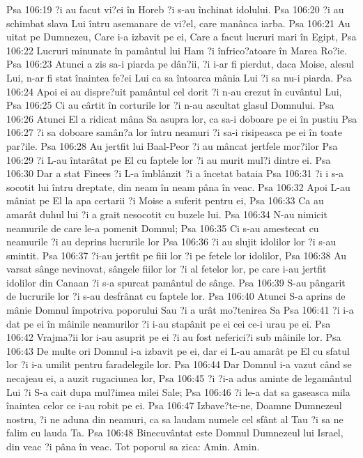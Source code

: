 Psa 106:19  ?i au facut vi?ei în Horeb ?i s-au închinat idolului.
Psa 106:20  ?i au schimbat slava Lui întru asemanare de vi?el, care manânca iarba.
Psa 106:21  Au uitat pe Dumnezeu, Care i-a izbavit pe ei, Care a facut lucruri mari în Egipt,
Psa 106:22  Lucruri minunate în pamântul lui Ham ?i înfrico?atoare în Marea Ro?ie.
Psa 106:23  Atunci a zis sa-i piarda pe dân?ii, ?i i-ar fi pierdut, daca Moise, alesul Lui, n-ar fi stat înaintea fe?ei Lui ca sa întoarca mânia Lui ?i sa nu-i piarda.
Psa 106:24  Apoi ei au dispre?uit pamântul cel dorit ?i n-au crezut în cuvântul Lui,
Psa 106:25  Ci au cârtit în corturile lor ?i n-au ascultat glasul Domnului.
Psa 106:26  Atunci El a ridicat mâna Sa asupra lor, ca sa-i doboare pe ei în pustiu
Psa 106:27  ?i sa doboare samân?a lor întru neamuri ?i sa-i risipeasca pe ei în toate par?ile.
Psa 106:28  Au jertfit lui Baal-Peor ?i au mâncat jertfele mor?ilor
Psa 106:29  ?i L-au întarâtat pe El cu faptele lor ?i au murit mul?i dintre ei.
Psa 106:30  Dar a stat Finees ?i L-a îmblânzit ?i a încetat bataia
Psa 106:31  ?i i s-a socotit lui întru dreptate, din neam în neam pâna în veac.
Psa 106:32  Apoi L-au mâniat pe El la apa certarii ?i Moise a suferit pentru ei,
Psa 106:33  Ca au amarât duhul lui ?i a grait nesocotit cu buzele lui.
Psa 106:34  N-au nimicit neamurile de care le-a pomenit Domnul;
Psa 106:35  Ci s-au amestecat cu neamurile ?i au deprins lucrurile lor
Psa 106:36  ?i au slujit idolilor lor ?i s-au smintit.
Psa 106:37  ?i-au jertfit pe fiii lor ?i pe fetele lor idolilor,
Psa 106:38  Au varsat sânge nevinovat, sângele fiilor lor ?i al fetelor lor, pe care i-au jertfit idolilor din Canaan ?i s-a spurcat pamântul de sânge.
Psa 106:39  S-au pângarit de lucrurile lor ?i s-au desfrânat cu faptele lor.
Psa 106:40  Atunci S-a aprins de mânie Domnul împotriva poporului Sau ?i a urât mo?tenirea Sa
Psa 106:41  ?i i-a dat pe ei în mâinile neamurilor ?i i-au stapânit pe ei cei ce-i urau pe ei.
Psa 106:42  Vrajma?ii lor i-au asuprit pe ei ?i au fost neferici?i sub mâinile lor.
Psa 106:43  De multe ori Domnul i-a izbavit pe ei, dar ei L-au amarât pe El cu sfatul lor ?i i-a umilit pentru faradelegile lor.
Psa 106:44  Dar Domnul i-a vazut când se necajeau ei, a auzit rugaciunea lor,
Psa 106:45  ?i ?i-a adus aminte de legamântul Lui ?i S-a cait dupa mul?imea milei Sale;
Psa 106:46  ?i le-a dat sa gaseasca mila înaintea celor ce i-au robit pe ei.
Psa 106:47  Izbave?te-ne, Doamne Dumnezeul nostru, ?i ne aduna din neamuri, ca sa laudam numele cel sfânt al Tau ?i sa ne falim cu lauda Ta.
Psa 106:48  Binecuvântat este Domnul Dumnezeul lui Israel, din veac ?i pâna în veac. Tot poporul sa zica: Amin. Amin.
